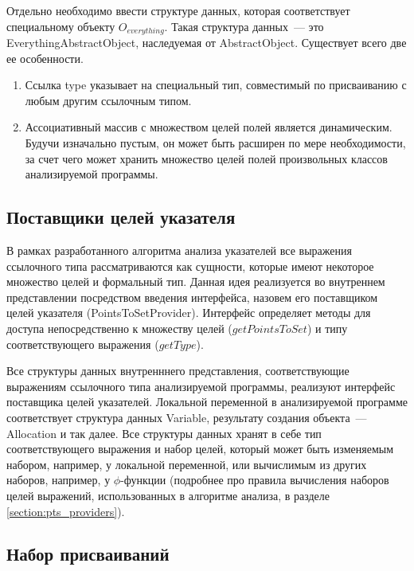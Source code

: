 \documentclass[14pt,titlepage]{extarticle}
\let\oldphi\phi
\renewcommand{\phi}{\ensuremath{\oldphi}}
\newcommand{\eng}[1]{{\English#1}}
\begin{document}
      Отдельно необходимо ввести структуре данных, которая соответствует
      специальному объекту $O_{everything}$. Такая структура данных~--- это
      \eng{Everything\-Abstract\-Object}, наследуемая от \eng{AbstractObject}.
      Существует всего две ее особенности.
      \begin{enumerate}
        \item Ссылка \eng{type} указывает на специальный тип, совместимый по
              присваиванию с любым другим ссылочным типом.
        \item Ассоциативный массив с множеством целей полей является
              динамическим. Будучи изначально пустым, он может быть расширен
              по мере необходимости, за счет чего может хранить множество целей
              полей произвольных классов анализируемой программы.
      \end{enumerate}

    \subsection{Поставщики целей указателя}

      В рамках разработанного алгоритма анализа указателей все выражения
      ссылочного типа рассматриваются как сущности, которые имеют некоторое
      множество целей и формальный тип.
      Данная идея реализуется во внутреннем представлении посредством введения
      интерфейса, назовем его поставщиком целей указателя
      (\eng{PointsToSetProvider}).
      Интерфейс определяет методы для доступа непосредственно к множеству целей
      ($getPointsToSet$) и типу соответствующего выражения ($getType$).

      Все структуры данных внутренннего представления, соответствующие выражениям
      ссылочного типа анализируемой программы, реализуют интерфейс поставщика
      целей указателей.
      Локальной переменной в анализируемой программе соответствует структура
      данных \eng{Variable}, результату создания объекта~--- \eng{Allocation} и
      так далее.
      Все структуры данных хранят в себе тип соответствующего выражения и набор
      целей, который может быть изменяемым набором, например, у локальной
      переменной, или вычислимым из других наборов, например, у \phi-функции
      (подробнее про правила вычисления наборов целей выражений, использованных
      в алгоритме анализа, в разделе \ref{section:pts_providers}).

    \subsection{Набор присваиваний}
\end{document}
